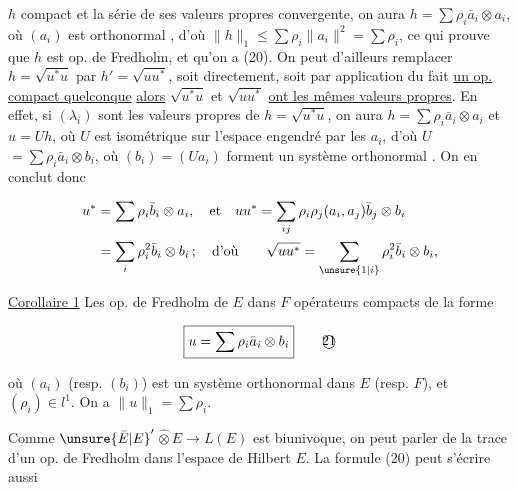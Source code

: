 $h$ compact et la série  de ses valeurs propres convergente, on aura
$h=\sum\rho_i\bar a_i\otimes a_i$, où $(a_i)$ est orthonormal , d'où
$\|h\|_1\leq\sum\rho_i\|a_i\|^2=\sum\rho_i$, ce qui prouve que $h$ est op. de
Fredholm, et qu'on a (20). On peut d'ailleurs remplacer
 $h=\sqrt{u^*u}$ par $h'=\sqrt{uu^*}$,  soit
directement, soit par application du fait   
 \uline{un op. compact quelconque}  \uline{alors} $\sqrt{u^*u}$ et $\sqrt{uu^*}$
\uline{ont les mêmes valeurs propres}. En effet, si $(\lambda_i)$ sont
les valeurs propres de $h=\sqrt{u^*u}$, on aura $h=\sum\rho_i\bar a_i\otimes a_i$
et $u=Uh$, où $U$ est isométrique sur l'espace engendré
par les $a_i$, d'où $U$$=\sum\rho_i\bar a_i\otimes b_i$, où $(b_i)=(Ua_i)$
forment un système orthonormal . On en conclut donc

\[
\begin{aligned}
u^*&=\sum\rho_i\bar b_i\otimes a_i,\quad\text{et}\quad uu^*=\sum_{ij}\rho_i\rho_j(a_i,a_j)\bar b_j\otimes b_i\\
&=\sum_i\rho_i^2\bar b_i\otimes b_i\,;\quad\text{d'où}\qquad
\sqrt{uu^*}=\sum_{\unsure{1|i}}\rho_i^2\bar b_i\otimes b_i,
\end{aligned}
\]

\uline{Corollaire 1} Les op. de Fredholm de $E$ dans $F$  
opérateurs compacts de la forme

\[
\boxed{u=\sum\rho_i\bar a_i\otimes b_i} \tag*{\textcircled{21}}
\]

où $(a_i)$ (resp. $(b_i)$) est un système orthonormal
dans $E$ (resp. $F$), et $(\rho_i)\in l^1$. On a $\|u\|_1=\sum\rho_i$.


Comme $\unsure{\bar E|E}'$$\widehat\otimes E\to L(E)$ est biunivoque, on peut parler
de la trace d'un op. de Fredholm dans l'espace de Hilbert $E$.
 La formule (20) peut s'écrire aussi

